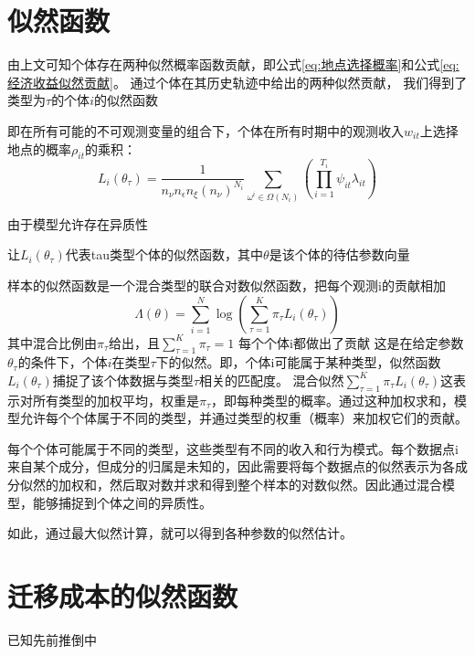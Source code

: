\documentclass[a4paper, zihao=-4, fontset = mac, oneside]{ctexbook} %
\begin{document}
\section{似然函数}

由上文可知个体存在两种似然概率函数贡献，即公式\ref{eq:地点选择概率}和公式\ref{eq:经济收益似然贡献}。
通过个体在其历史轨迹中给出的两种似然贡献，
我们得到了类型为$\tau$的个体$i$的似然函数

即在所有可能的不可观测变量的组合下，个体在所有时期中的观测收入$w_{it}$上选择地点的概率$\rho_{it}$的乘积：
\begin{equation}
  L_{i}(\theta_{\tau})=\frac{1}{n_{\nu}n_{\epsilon}n_{\xi}(n_{\nu})^{N_{i}}} \sum\limits_{\omega^{i}\in\Omega(N_{i})}(\prod\limits_{i=1}^{T_{i}} \psi_{it}\lambda_{it})
\end{equation}

由于模型允许存在异质性

让$L_{i}(\theta_{\tau})$代表tau类型个体的似然函数，其中$\theta$是该个体的待估参数向量

样本的似然函数是一个混合类型的联合对数似然函数，把每个观测i的贡献相加
\begin{equation}
\Lambda(\theta)=\sum\limits_{i=1}^{N}\log(\sum\limits_{\tau=1}^{K}\pi_{\tau}L_{i}(\theta_{\tau})) 
\end{equation}
其中混合比例由$\pi_{\tau}$给出，且$\sum\limits_{\tau=1}^{K}\pi_{\tau}=1$
每个个体i都做出了贡献
这是在给定参数$\theta_{\tau}$的条件下，个体$i$在类型$\tau$下的似然。即，个体i可能属于某种类型，似然函数
$L_i(\theta_{\tau})$捕捉了该个体数据与类型$\tau$相关的匹配度。
混合似然$\sum_{\tau=1}^{K} \pi_{\tau} L_i(\theta_{\tau})$这表示对所有类型的加权平均，权重是$\pi_{\tau}$，即每种类型的概率。通过这种加权求和，模型允许每个个体属于不同的类型，并通过类型的权重（概率）来加权它们的贡献。

每个个体可能属于不同的类型，这些类型有不同的收入和行为模式。每个数据点i来自某个成分，但成分的归属是未知的，因此需要将每个数据点的似然表示为各成分似然的加权和，然后取对数并求和得到整个样本的对数似然。因此通过混合模型，能够捕捉到个体之间的异质性。


如此，通过最大似然计算，就可以得到各种参数的似然估计。

\section{迁移成本的似然函数}

已知先前推倒中


\end{document}
